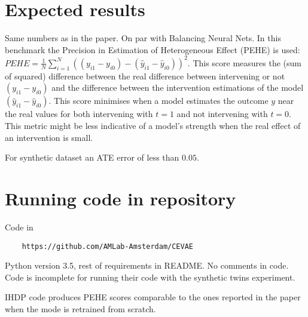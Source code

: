 \documentclass{article}
\begin{document}
\section{Expected results}
Same numbers as in the paper. On par with Balancing Neural Nets\cite{johansson2016learning}. In this benchmark the Precision in Estimation of Heterogeneous Effect (PEHE) is used: $PEHE = \frac{1}{N}\sum^N_{i=1} ((y_{i1}  - y_{i0}) - (\hat{y}_{i1} - \hat{y}_{i0}))^2$. This score measures the (sum of squared) difference between the real difference between intervening or not $(y_{i1}  - y_{i0})$ and the difference between the intervention estimations of the model $(\hat{y}_{i1} - \hat{y}_{i0})$. This score minimises when a model estimates the outcome $y$ near the real values for both intervening with $t=1$ and not intervening with $t=0$. This metric might be less indicative of a model's strength when the real effect of an intervention is small.

For synthetic dataset an ATE  error of less than $0.05$.

\section{Running code in repository}
Code in \begin{verbatim}
    https://github.com/AMLab-Amsterdam/CEVAE
\end{verbatim}
Python version 3.5, rest of requirements in README. No comments in code. Code is incomplete for running their code with the synthetic twins experiment. 

IHDP code produces PEHE scores comparable to the ones reported in the paper when the mode is retrained from scratch.




\end{document}
